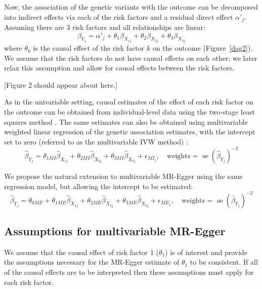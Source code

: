 \documentclass[a4paper,12pt]{article}
\DeclareMathOperator{\se}{se} %
\begin{document}
\begin{bibunit}[wileyj]
Now, the association of the genetic variants with the outcome can be decomposed into indirect effects via each of the risk factors and a residual direct effect $\alpha'_j$. Assuming there are 3 risk factors and all relationships are linear:
\begin{equation}
\beta_{Y_{j}} = \alpha'_j + \theta_1 \beta_{X_{1j}} + \theta_2 \beta_{X_{2j}} + \theta_3 \beta_{X_{3j}}
\label{eq:multivariable}
\end{equation}
where $\theta_k$ is the causal effect of the risk factor $k$ on the outcome (Figure~\ref{dag2}). We assume that the risk factors do not have causal effects on each other; we later relax this assumption and allow for causal effects between the risk factors. %

\begin{center}
[Figure 2 should appear about here.]
\end{center}

As in the univariable setting, causal estimates of the effect of each risk factor on the outcome can be obtained from individual-level data using the two-stage least squares method \cite{burgess2015multivariable}. The same estimates can also be obtained using multivariable weighted linear regression of the genetic association estimates, with the intercept set to zero (referred to as the multivariable IVW method) \cite{burgess2015letter}:
\begin{equation}
\hat{\beta}_{Y_{j}} = \theta_{1MI} \hat{\beta}_{X_{1j}} + \theta_{2MI} \hat{\beta}_{X_{2j}} + \theta_{3MI} \hat{\beta}_{X_{3j}} + \epsilon_{MI_{j}}, \quad \mbox{weights = } \se(\hat{\beta}_{Y_{j}})^{-2} \label{eq:mvivw}
\end{equation}

We propose the natural extension to multivariable MR-Egger using the same regression model, but allowing the intercept to be estimated:
\begin{equation}
\hat{\beta}_{Y_{j}} = \theta_{0ME} + \theta_{1ME} \hat{\beta}_{X_{1j}} + \theta_{2ME} \hat{\beta}_{X_{2j}} + \theta_{3ME} \hat{\beta}_{X_{3j}} + \epsilon_{ME_{j}}, \quad \mbox{weights = } \se(\hat{\beta}_{Y_{j}})^{-2}
\label{eq:mvegg}
\end{equation}


\subsection{Assumptions for multivariable MR-Egger}
\label{sec:inside}
We assume that the causal effect of risk factor 1 ($\theta_1$) is of interest and provide the assumptions necessary for the MR-Egger estimate of $\theta_1$ to be consistent. If all of the causal effects are to be interpreted then these assumptions must apply for each risk factor.


\end{bibunit}
\end{document}
